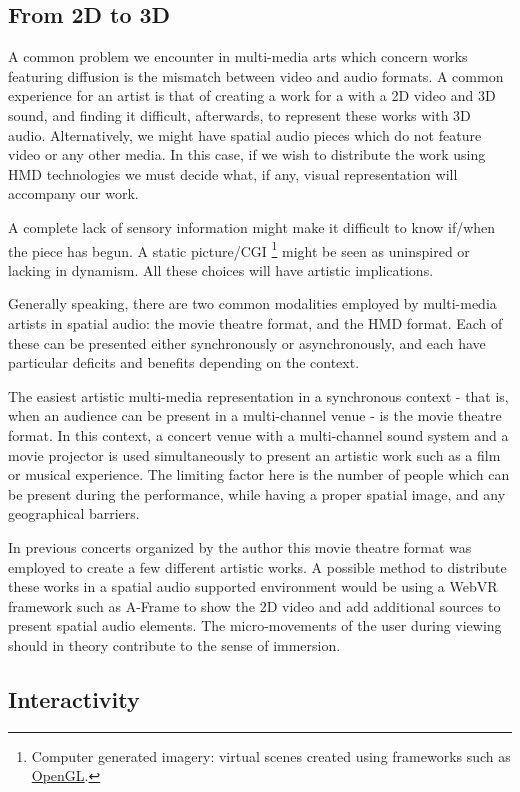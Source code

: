 \subsection{From 2D to 3D}

A common problem we encounter in multi-media arts which concern works featuring diffusion is the mismatch between video and audio formats. A common experience for an artist is that of creating a work for a with a 2D video and 3D sound, and finding it difficult, afterwards, to represent these works with 3D audio. Alternatively, we might have spatial audio pieces which do not feature video or any other media. In this case, if we wish to distribute the work using HMD technologies we must decide what, if any, visual representation will accompany our work. 

A complete lack of sensory information might make it difficult to know if/when the piece has begun. A static picture/CGI \footnote{Computer generated imagery: virtual scenes created using frameworks such as \href{https://www.opengl.org/}{OpenGL}.} might be seen as uninspired or lacking in dynamism. All these choices will have artistic implications. 

Generally speaking, there are two common modalities employed by multi-media artists in spatial audio: the movie theatre format, and the HMD format. Each of these can be presented either synchronously or asynchronously, and each have particular deficits and benefits depending on the context. 

The easiest artistic multi-media representation in a synchronous context - that is, when an audience can be present in a multi-channel venue - is the movie theatre format. In this context, a concert venue with a multi-channel sound system and a movie projector is used simultaneously to present an artistic work such as a film or musical experience. The limiting factor here is the number of people which can be present during the performance, while having a proper spatial image, and any geographical barriers. 

In previous concerts organized by the author this movie theatre format was employed to create a few different artistic works. A possible method to distribute these works in a spatial audio supported environment would be using a WebVR framework such as A-Frame to show the 2D video and add additional sources to present spatial audio elements. The micro-movements of the user during viewing should in theory contribute to the sense of immersion.  

\subsection{Interactivity}



